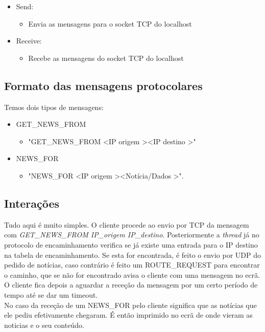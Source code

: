\documentclass{llncs}
\begin{document}
\begin{itemize}
    \item Send: \begin{itemize}
        \item Envia as mensagens para o socket TCP do localhost
    \end{itemize}
    \item Receive: \begin{itemize}
        \item Recebe as mensagens do socket TCP do localhost
    \end{itemize}
\end{itemize}

\subsection{Formato das mensagens protocolares}

Temos dois tipos de mensagens:
\begin{itemize}
    \item GET\_NEWS\_FROM \begin{itemize}
        \item "GET\_NEWS\_FROM \textless IP origem \textgreater \textless IP destino \textgreater"
    \end{itemize}
    \item NEWS\_FOR \begin{itemize}
        \item "NEWS\_FOR \textless IP origem \textgreater \textless Notícia/Dados \textgreater".
    \end{itemize}
\end{itemize}


\subsection{Interações}

Tudo aqui é muito simples. O cliente procede ao envio por TCP da mensagem com \emph{GET\_NEWS\_FROM IP\_origem IP\_destino}. Posteriormente a \emph{thread} já no protocolo de encaminhamento verifica se já existe uma entrada para o IP destino na tabela de encaminhamento. Se esta for encontrada, é feito o envio por UDP do pedido de notícias, caso contrário é feito um ROUTE\_REQUEST para encontrar o caminho, que se não for encontrado avisa o cliente com uma mensagem no ecrã.\\
O cliente fica depois a aguardar a receção da mensagem por um certo período de tempo até se dar um timeout.
\\
No caso da receção de um NEWS\_FOR pelo cliente significa que as notícias que ele pediu efetivamente chegaram. É então imprimido no ecrã de onde vieram as noticias e o seu conteúdo.
\end{document}
